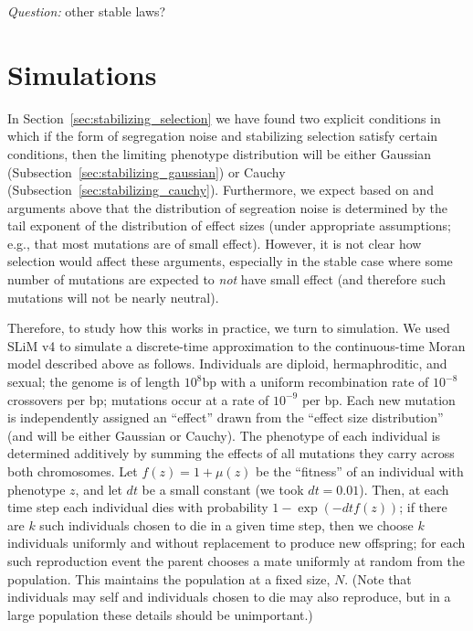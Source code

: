 \documentclass{article}
\theoremstyle{remark}
\theoremstyle{definition}
\begin{document}

\bigskip

\noindent\emph{Question:} other stable laws?


\section{Simulations}

In Section~\ref{sec:stabilizing_selection}
we have found two explicit conditions in which
if the form of segregation noise and stabilizing selection
satisfy certain conditions,
then the limiting phenotype distribution
will be either Gaussian (Subsection~\ref{sec:stabilizing_gaussian})
or Cauchy (Subsection~\ref{sec:stabilizing_cauchy}).
Furthermore, we expect based on
\citet{barton2017infinitesimal} and arguments above
that the distribution of segreation noise
is determined by the tail exponent of the distribution of effect sizes
(under appropriate assumptions; e.g., that most mutations are of small effect).
However, it is not clear how selection would affect these arguments,
especially in the stable case where some number of mutations are expected to
\emph{not} have small effect (and therefore such mutations will not be nearly neutral).

Therefore,
to study how this works in practice, we turn to simulation.
We used SLiM v4 \citep{haller2022slim4}
to simulate a discrete-time approximation to the continuous-time Moran model described above
as follows.
Individuals are diploid, hermaphroditic, and sexual;
the genome is of length $10^8$bp with a uniform recombination rate of $10^{-8}$ crossovers per bp;
mutations occur at a rate of $10^{-9}$ per bp.
Each new mutation is independently assigned an ``effect''
drawn from the ``effect size distribution'' (and will be either Gaussian or Cauchy).
The phenotype of each individual is determined additively
by summing the effects of all mutations they carry across both chromosomes.
Let $f(z) = 1 + \mu(z)$
be the ``fitness'' of an individual with phenotype $z$,
and let $dt$ be a small constant (we took $dt=0.01$).
Then, at each time step
each individual dies with probability $1 - \exp(-dt f(z))$;
if there are $k$ such individuals chosen to die in a given time step,
then we choose $k$ individuals uniformly and without replacement
to produce new offspring;
for each such reproduction event the parent chooses a mate uniformly at random from the population.
This maintains the population at a fixed size, $N$.
(Note that individuals may self and individuals chosen to die may also reproduce,
but in a large population these details should be unimportant.)
\end{document}
